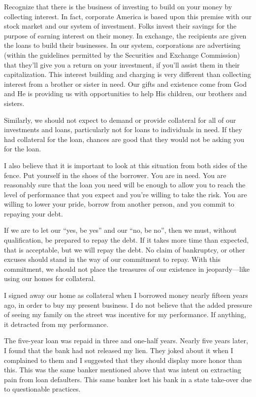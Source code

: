 \documentclass[12pt]{memoir}
\begin{document}
Recognize that there is the business of investing to build on your money by collecting interest. In fact, corporate America is based upon this premise with our stock market and our system of investment. Folks invest their savings for the purpose of earning interest on their money. In exchange, the recipients are given the loans to build their businesses. In our system, corporations are advertising (within the guidelines permitted by the Securities and Exchange Commission) that they'll give you a return on your investment, if you'll assist them in their capitalization. This interest building and charging is very different than collecting interest from a brother or sister in need. Our gifts and existence come from God and He is providing us with opportunities to help His children, our brothers and sisters.

Similarly, we should not expect to demand or provide collateral for all of our investments and loans, particularly not for loans to individuals in need. If they had collateral for the loan, chances are good that they would not be asking you for the loan. 

I also believe that it is important to look at this situation from both sides of the fence. Put yourself in the shoes of the borrower. You are in need. You are reasonably sure that the loan you need will be enough to allow you to reach the level of performance that you expect and you're willing to take the risk. You are willing to lower your pride, borrow from another person, and you commit to repaying your debt. 

If we are to let our ``yes, be yes'' and our ``no, be no'', then we must, without qualification, be prepared to repay the debt. If it takes more time than expected, that is acceptable, but we will repay the debt. No claim of bankruptcy, or other excuses should stand in the way of our commitment to repay. With this commitment, we should not place the treasures of our existence in jeopardy---like using our homes for collateral. 

I signed away our home as collateral when I borrowed money nearly fifteen years ago, in order to buy my present business. I do not believe that the added pressure of seeing my family on the street was incentive for my performance. If anything, it detracted from my performance.

The five-year loan was repaid in three and one-half years. Nearly five years later, I found that the bank had not released my lien. They joked about it when I complained to them and I suggested that they should display more honor than this. This was the same banker mentioned above that was intent on extracting pain from loan defaulters. This same banker lost his bank in a state take-over due to questionable practices.
\end{document}
